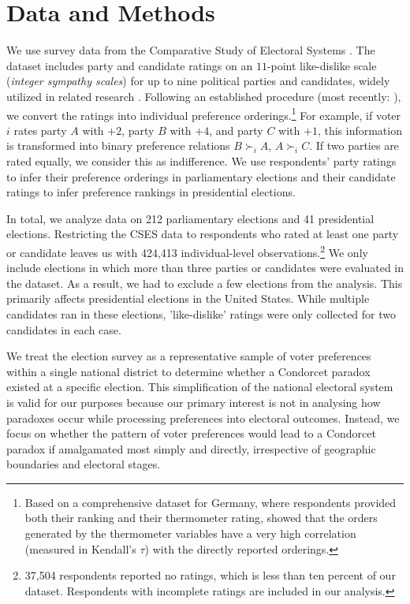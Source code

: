 \documentclass[12pt]{scrartcl}
\newcommand{\nbparliament}{212 }
\newcommand{\nbpresidential}{41 }
\begin{document}
\section{Data and Methods}\label{sec.datamethods}  
We use survey data from the Comparative Study of Electoral Systems \citep{CSES2020}. The dataset includes party and candidate ratings on an $11$-point like-dislike scale (\emph{integer sympathy scales}) for up to nine political parties and candidates, widely utilized in related research \citep[e.g.,][]{Kalandrakis2022, Desai2025}. Following an established procedure (most recently: \cite{Lachat2024}), we convert the ratings into individual preference orderings.\footnote{
    Based on a comprehensive dataset for Germany, where respondents provided both their ranking and their thermometer rating, \cite{Barbaro2022} showed that the orders generated by the thermometer variables have a very high correlation (measured in Kendall's $\tau$) with the directly reported orderings.
} For example, if voter $i$ rates party $A$ with $+2$, party $B$ with $+4$, and party $C$ with $+1$, this information is transformed into binary preference relations $B \succ_i A$, $A \succ_i C$. If two parties are rated equally, we consider this as indifference. We use respondents' party ratings to infer their preference orderings in parliamentary elections and their candidate ratings to infer preference rankings in presidential elections.

In total, we analyze data on \nbparliament parliamentary elections and \nbpresidential presidential elections. Restricting the CSES data to respondents who rated at least one party or candidate leaves us with 424,413 individual-level observations.\footnote{
    37,504 respondents reported no ratings, which is less than ten percent of our dataset. Respondents with incomplete ratings are included in our analysis.
} We only include elections in which more than three parties or candidates were evaluated in the dataset. As a result, we had to exclude a few elections from the analysis. This primarily affects presidential elections in the United States. While multiple candidates ran in these elections, 'like-dislike' ratings were only collected for two candidates in each case.

We treat the election survey as a representative sample of voter preferences within a single national district to determine whether a Condorcet paradox existed at a specific election. This simplification of the national electoral system is valid for our purposes because our primary interest is not in analysing how paradoxes occur while processing preferences into electoral outcomes. Instead, we focus on whether the pattern of voter preferences would lead to a Condorcet paradox if amalgamated most simply and directly, irrespective of geographic boundaries and electoral stages.
\end{document}
